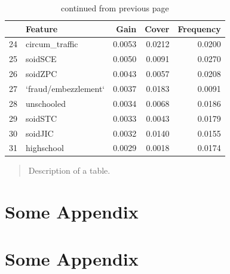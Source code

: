 \documentclass[12pt, twoside,openany]{book} %
\begin{document}
\begin{appendices}
\begin{table}[ht]
\centering
\begin{tabular}{rlrrr}
  \hline
 & Feature & Gain & Cover & Frequency \\ 
  \hline
24 & circum\_traffic & 0.0053 & 0.0212 & 0.0200 \\ 
  25 & soidSCE & 0.0050 & 0.0091 & 0.0270 \\ 
  26 & soidZPC & 0.0043 & 0.0057 & 0.0208 \\ 
  27 & `fraud/embezzlement` & 0.0037 & 0.0183 & 0.0091 \\ 
  28 & unschooled & 0.0034 & 0.0068 & 0.0186 \\ 
  29 & soidSTC & 0.0033 & 0.0043 & 0.0179 \\ 
  30 & soidJIC & 0.0032 & 0.0140 & 0.0155 \\ 
  31 & highschool & 0.0029 & 0.0018 & 0.0174 \\ 
   \hline
\end{tabular}
\renewcommand\thetable{B.1}
 \caption{continued from previous page}
\medskip
{\small 
\begin{quotation}
Description of a table.
\end{quotation}
}

\end{table}







\chapter{Some Appendix}
\chapter{Some Appendix}




\end{appendices}
\end{document}

